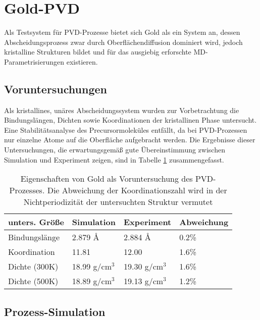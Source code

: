 \section{Gold-PVD}

Als Testsystem für PVD-Prozesse bietet sich Gold als ein System an, dessen Abscheidungsprozess zwar durch Oberflächendiffusion dominiert wird, jedoch kristalline Strukturen bildet und für das ausgiebig erforschte MD-Parametrisierungen existieren.

\subsection{Voruntersuchungen}

Als kristallines, unäres Abscheidungssystem wurden zur Vorbetrachtung die Bindungslängen, Dichten sowie Koordinationen der kristallinen Phase untersucht.
Eine Stabilitätsanalyse des Precursormoleküles entfällt, da bei PVD-Prozessen nur einzelne Atome auf die Oberfläche aufgebracht werden.
Die Ergebnisse dieser Untersuchungen, die erwartungsgemäß gute Übereinstimmung zwischen Simulation und Experiment zeigen, sind in Tabelle \ref{tab:goldpreresults} zusammengefasst.

\begin{table}[hbtp]
  \caption[Eigenschaften von Gold]{Eigenschaften von Gold als Voruntersuchung des PVD-Prozesses. Die Abweichung der Koordinationszahl wird in der Nichtperiodizität der untersuchten Struktur vermutet}
  \label{tab:goldpreresults}
  \begin{tabularx}{\textwidth}{|XXXX|}
    \hline
    \textbf{unters. Größe} & \textbf{Simulation} & \textbf{Experiment} & \textbf{Abweichung}\\
    \hline
    Bindungslänge & 2.879 \AA & 2.884 \AA & 0.2\% \\
    Koordination & 11.81 & 12.00 & 1.6\% \\
    Dichte (300K) & 18.99 g/cm$^3$ & 19.30 g/cm$^3$ & 1.6\%\\
    Dichte (500K) & 18.89 g/cm$^3$ & 19.13 g/cm$^3$ & 1.2\%\\
    \hline
  \end{tabularx}
\end{table}


\subsection{Prozess-Simulation}

